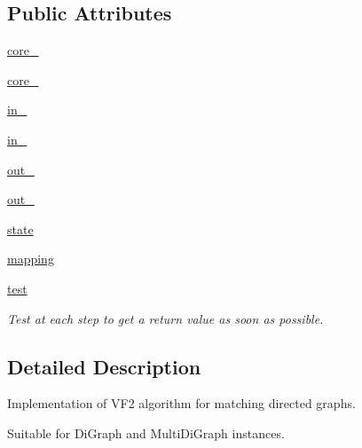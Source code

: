 \subsection*{Public Attributes}
\begin{DoxyCompactItemize}
\item 
\hyperlink{classnetworkx_1_1algorithms_1_1isomorphism_1_1isomorphvf2_1_1DiGraphMatcher_a269e9006d68f19d5bc62f165aed6b4e5}{core\+\_}
\item 
\hyperlink{classnetworkx_1_1algorithms_1_1isomorphism_1_1isomorphvf2_1_1DiGraphMatcher_a055c31fd55d3ad5e9fda2985e8894a6f}{core\+\_}
\item 
\hyperlink{classnetworkx_1_1algorithms_1_1isomorphism_1_1isomorphvf2_1_1DiGraphMatcher_aed5ab955c8ba50f62d44c2bce7b46159}{in\+\_}
\item 
\hyperlink{classnetworkx_1_1algorithms_1_1isomorphism_1_1isomorphvf2_1_1DiGraphMatcher_a2071fdb0381ad44789a18c1f1eb25fc2}{in\+\_}
\item 
\hyperlink{classnetworkx_1_1algorithms_1_1isomorphism_1_1isomorphvf2_1_1DiGraphMatcher_aba41878365f78d9b3685f4747eddf0eb}{out\+\_}
\item 
\hyperlink{classnetworkx_1_1algorithms_1_1isomorphism_1_1isomorphvf2_1_1DiGraphMatcher_a39e27c21b742d22fb4b51c8085eddd27}{out\+\_}
\item 
\hyperlink{classnetworkx_1_1algorithms_1_1isomorphism_1_1isomorphvf2_1_1DiGraphMatcher_a97d2cf67c02bb2d090ec92cc126637f8}{state}
\item 
\hyperlink{classnetworkx_1_1algorithms_1_1isomorphism_1_1isomorphvf2_1_1DiGraphMatcher_a6dd0d499b74577a30d20218e543c9933}{mapping}
\item 
\hyperlink{classnetworkx_1_1algorithms_1_1isomorphism_1_1isomorphvf2_1_1DiGraphMatcher_ac72b34204ff872f87735f458353d565b}{test}
\begin{DoxyCompactList}\small\item\em Test at each step to get a return value as soon as possible. \end{DoxyCompactList}\end{DoxyCompactItemize}


\subsection{Detailed Description}
\begin{DoxyVerb}Implementation of VF2 algorithm for matching directed graphs.

Suitable for DiGraph and MultiDiGraph instances.
\end{DoxyVerb}
 

